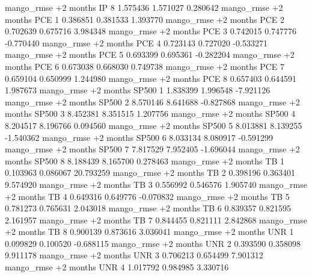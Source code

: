 mango_rmse +2 months       IP                 8 1.575436       1.571027           0.280642
mango_rmse +2 months      PCE                 1 0.386851       0.381533           1.393770
mango_rmse +2 months      PCE                 2 0.702639       0.675716           3.984348
mango_rmse +2 months      PCE                 3 0.742015       0.747776          -0.770440
mango_rmse +2 months      PCE                 4 0.723143       0.727020          -0.533271
mango_rmse +2 months      PCE                 5 0.693399       0.695361          -0.282204
mango_rmse +2 months      PCE                 6 0.673038       0.668030           0.749738
mango_rmse +2 months      PCE                 7 0.659104       0.650999           1.244980
mango_rmse +2 months      PCE                 8 0.657403       0.644591           1.987673
mango_rmse +2 months    SP500                 1 1.838399       1.996548          -7.921126
mango_rmse +2 months    SP500                 2 8.570146       8.641688          -0.827868
mango_rmse +2 months    SP500                 3 8.452381       8.351515           1.207756
mango_rmse +2 months    SP500                 4 8.204517       8.196766           0.094560
mango_rmse +2 months    SP500                 5 8.013881       8.139255          -1.540362
mango_rmse +2 months    SP500                 6 8.033134       8.080917          -0.591299
mango_rmse +2 months    SP500                 7 7.817529       7.952405          -1.696044
mango_rmse +2 months    SP500                 8 8.188439       8.165700           0.278463
mango_rmse +2 months       TB                 1 0.103963       0.086067          20.793259
mango_rmse +2 months       TB                 2 0.398196       0.363401           9.574920
mango_rmse +2 months       TB                 3 0.556992       0.546576           1.905740
mango_rmse +2 months       TB                 4 0.649316       0.649776          -0.070832
mango_rmse +2 months       TB                 5 0.781273       0.765631           2.043018
mango_rmse +2 months       TB                 6 0.839357       0.821595           2.161957
mango_rmse +2 months       TB                 7 0.844455       0.821111           2.842868
mango_rmse +2 months       TB                 8 0.900139       0.873616           3.036041
mango_rmse +2 months      UNR                 1 0.099829       0.100520          -0.688115
mango_rmse +2 months      UNR                 2 0.393590       0.358098           9.911178
mango_rmse +2 months      UNR                 3 0.706213       0.654499           7.901312
mango_rmse +2 months      UNR                 4 1.017792       0.984985           3.330716
